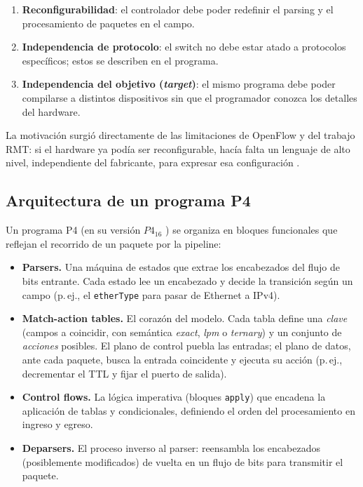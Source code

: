 \documentclass[conference,onecolumn,10pt]{IEEEtran}
\begin{document}
\begin{enumerate}
\item \textbf{Reconfigurabilidad}: el controlador debe poder redefinir el
parsing y el procesamiento de paquetes en el campo.
\item \textbf{Independencia de protocolo}: el switch no debe estar atado a
protocolos específicos; estos se describen en el programa.
\item \textbf{Independencia del objetivo (\emph{target})}: el mismo programa debe
poder compilarse a distintos dispositivos sin que el programador conozca los
detalles del hardware.
\end{enumerate}

La motivación surgió directamente de las limitaciones de OpenFlow y del trabajo
RMT: si el hardware ya podía ser reconfigurable, hacía falta un lenguaje de alto
nivel, independiente del fabricante, para expresar esa configuración
\cite{bosshart2014p4, bosshart2013rmt}.

\subsection{Arquitectura de un programa P4}
Un programa P4 (en su versión $P4_{16}$ \cite{p4spec}) se organiza en bloques
funcionales que reflejan el recorrido de un paquete por la pipeline:

\begin{itemize}
\item \textbf{Parsers.} Una máquina de estados que extrae los encabezados del
flujo de bits entrante. Cada estado lee un encabezado y decide la transición
según un campo (p.\,ej., el \texttt{etherType} para pasar de Ethernet a IPv4).
\item \textbf{Match-action tables.} El corazón del modelo. Cada tabla define una
\emph{clave} (campos a coincidir, con semántica \emph{exact}, \emph{lpm} o
\emph{ternary}) y un conjunto de \emph{acciones} posibles. El plano de control
puebla las entradas; el plano de datos, ante cada paquete, busca la entrada
coincidente y ejecuta su acción (p.\,ej., decrementar el TTL y fijar el puerto de
salida).
\item \textbf{Control flows.} La lógica imperativa (bloques \texttt{apply}) que
encadena la aplicación de tablas y condicionales, definiendo el orden del
procesamiento en ingreso y egreso.
\item \textbf{Deparsers.} El proceso inverso al parser: reensambla los
encabezados (posiblemente modificados) de vuelta en un flujo de bits para
transmitir el paquete.
\end{itemize}
\end{document}
